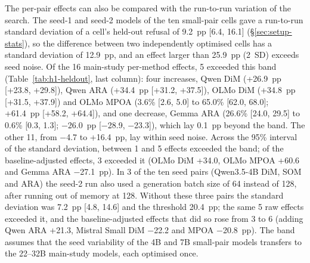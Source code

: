 The per-pair effects can also be compared with the run-to-run variation of
the search. The seed-1 and seed-2 models of the ten small-pair cells gave a
run-to-run standard deviation of a cell's held-out refusal of 9.2~pp [6.4,
16.1] (\S\ref{sec:setup-stats}), so the difference between two independently
optimised cells has a standard deviation of 12.9~pp, and an effect larger than
25.9~pp (2~SD) exceeds seed noise. Of the 16 main-study per-method effects, 5
exceeded this band (Table~\ref{tab:h1-heldout}, last column): four increases,
Qwen DiM (+26.9~pp [+23.8, +29.8]), Qwen ARA (+34.4~pp [+31.2, +37.5]), OLMo
DiM (+34.8~pp [+31.5, +37.9]) and OLMo MPOA (3.6\% [2.6, 5.0] to 65.0\%
[62.0, 68.0]; +61.4~pp [+58.2, +64.4]), and one decrease, Gemma ARA (26.6\%
[24.0, 29.5] to 0.6\% [0.3, 1.3]; $-$26.0~pp [$-$28.9, $-$23.3]), which lay
0.1~pp beyond the band. The other 11, from $-$4.7 to +16.4~pp, lay within
seed noise. Across the 95\% interval of the standard deviation, between 1 and
5 effects exceeded the band; of the baseline-adjusted effects, 3 exceeded it
(OLMo DiM +34.0, OLMo MPOA +60.6 and Gemma ARA $-$27.1~pp). In 3 of the ten
seed pairs (Qwen3.5-4B DiM, SOM and ARA) the seed-2 run also used a generation
batch size of 64 instead of 128, after running out of memory at 128. Without
these three pairs the standard deviation was 7.2~pp [4.8, 14.6] and the
threshold 20.4~pp; the same 5 raw effects exceeded it, and the
baseline-adjusted effects that did so rose from 3 to 6 (adding Qwen ARA
+21.3, Mistral Small DiM $-$22.2 and MPOA $-$20.8~pp). The band assumes that
the seed variability of the 4B and 7B small-pair models transfers to the
22--32B main-study models, each optimised once.

